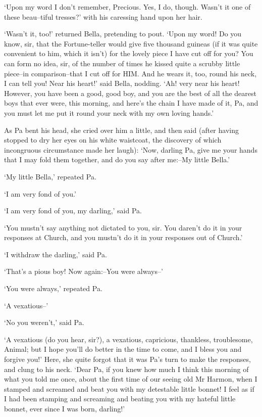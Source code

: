 ‘Upon my word I don’t remember, Precious. Yes, I do, though. Wasn’t
it one of these beau--tiful tresses?’ with his caressing hand upon her
hair.

‘Wasn’t it, too!’ returned Bella, pretending to pout. ‘Upon my word! Do
you know, sir, that the Fortune-teller would give five thousand guineas
(if it was quite convenient to him, which it isn’t) for the lovely piece
I have cut off for you? You can form no idea, sir, of the number of
times he kissed quite a scrubby little piece--in comparison--that I cut
off for HIM. And he wears it, too, round his neck, I can tell you! Near
his heart!’ said Bella, nodding. ‘Ah! very near his heart! However, you
have been a good, good boy, and you are the best of all the dearest boys
that ever were, this morning, and here’s the chain I have made of
it, Pa, and you must let me put it round your neck with my own loving
hands.’

As Pa bent his head, she cried over him a little, and then said (after
having stopped to dry her eyes on his white waistcoat, the discovery of
which incongruous circumstance made her laugh): ‘Now, darling Pa,
give me your hands that I may fold them together, and do you say after
me:--My little Bella.’

‘My little Bella,’ repeated Pa.

‘I am very fond of you.’

‘I am very fond of you, my darling,’ said Pa.

‘You mustn’t say anything not dictated to you, sir. You daren’t do it in
your responses at Church, and you mustn’t do it in your responses out of
Church.’

‘I withdraw the darling,’ said Pa.

‘That’s a pious boy! Now again:--You were always--’

‘You were always,’ repeated Pa.

‘A vexatious--’

‘No you weren’t,’ said Pa.

‘A vexatious (do you hear, sir?), a vexatious, capricious, thankless,
troublesome, Animal; but I hope you’ll do better in the time to come,
and I bless you and forgive you!’ Here, she quite forgot that it was
Pa’s turn to make the responses, and clung to his neck. ‘Dear Pa, if you
knew how much I think this morning of what you told me once, about the
first time of our seeing old Mr Harmon, when I stamped and screamed
and beat you with my detestable little bonnet! I feel as if I had been
stamping and screaming and beating you with my hateful little bonnet,
ever since I was born, darling!’

